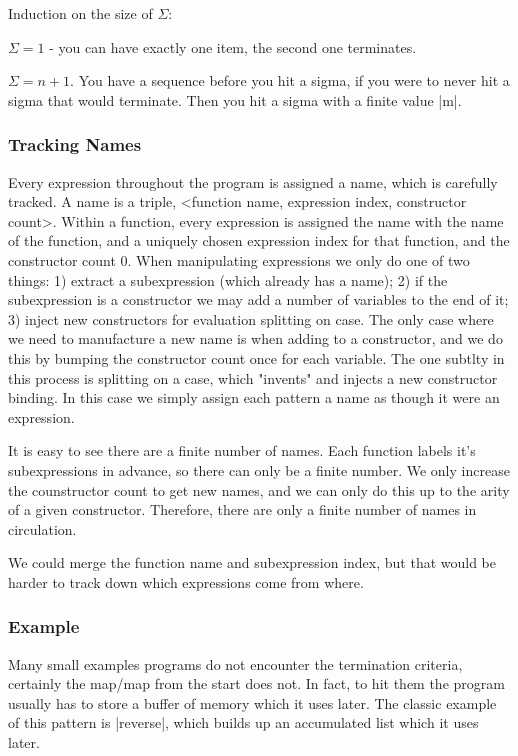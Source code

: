 \documentclass{sigplanconf}
\begin{document}
Induction on the size of $\Sigma$:

$\Sigma = 1$ - you can have exactly one item, the second one terminates.

$\Sigma = n+1$. You have a sequence before you hit a sigma, if you were to never hit a sigma that would terminate. Then you hit a sigma with a finite value |m|.

\subsubsection{Tracking Names}

Every expression throughout the program is assigned a name, which is carefully tracked. A name is a triple, <function name, expression index, constructor count>. Within a function, every expression is assigned the name with the name of the function, and a uniquely chosen expression index for that function, and the constructor count 0. When manipulating expressions we only do one of two things: 1) extract a subexpression (which already has a name); 2) if the subexpression is a constructor we may add a number of variables to the end of it; 3) inject new constructors for evaluation splitting on case. The only case where we need to manufacture a new name is when adding to a constructor, and we do this by bumping the constructor count once for each variable. The one subtlty in this process is splitting on a case, which "invents" and injects a new constructor binding. In this case we simply assign each pattern a name as though it were an expression.

It is easy to see there are a finite number of names. Each function labels it's subexpressions in advance, so there can only be a finite number. We only increase the counstructor count to get new names, and we can only do this up to the arity of a given constructor. Therefore, there are only a finite number of names in circulation.

We could merge the function name and subexpression index, but that would be harder to track down which expressions come from where.

\subsubsection{Example}

Many small examples programs do not encounter the termination criteria, certainly the map/map from the start does not. In fact, to hit them the program usually has to store a buffer of memory which it uses later. The classic example of this pattern is |reverse|, which builds up an accumulated list which it uses later.
\end{document}
